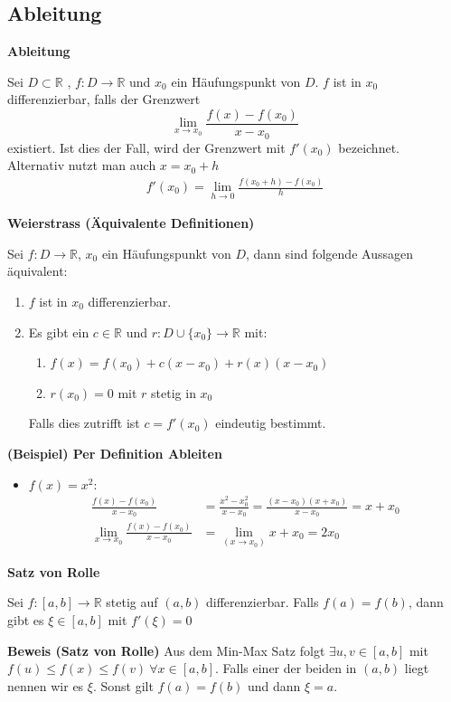 \documentclass[25pt]{sciposter}
\newcommand{\R}{\mathbb{R}}
\newenvironment{method}[1]{\begin{mdframed}[backgroundcolor=blue!10,innertopmargin=15pt, innerbottommargin=15pt, nobreak=true]
		\textbf{#1 }
	}
	{ 
	\end{mdframed}
}
\begin{document}
\begin{multicols}{3}
\section{Ableitung}

\begin{method}{Ableitung}
	Sei $D \subset \R$ , $f:D \to  \R$ und $x_0$ ein Häufungspunkt von $D$. $f$ ist in $x_0$ differenzierbar, falls der Grenzwert 
	$$ \lim\limits_{x \to x_0} \frac{f(x) -f(x_0)}{x-x_0}$$
	existiert. Ist dies der Fall, wird der Grenzwert mit $f'(x_0)$ bezeichnet.\\
	Alternativ nutzt man auch $x = x_0 + h$
	\begin{align*}
			f'(x_0) = \lim\limits_{h \to 0} \frac{f(x_0 + h) - f(x_0)}{h}
	\end{align*}
\end{method}


\begin{method}{Weierstrass (Äquivalente Definitionen)}
Sei $f : D \to \R$, $x_0$ ein Häufungspunkt von $D$, dann sind folgende Aussagen äquivalent:
\begin{enumerate}
	\item $f$ ist in $x_0$ differenzierbar.
	\item Es gibt ein $c\in \R$ und $r : D \cup \{x_0\} \to \R$ mit:
	\begin{enumerate}
		\item $f(x) = f(x_0) + c(x-x_0) + r(x) (x-x_0)$
		\item $r(x_0) = 0$ mit $r$ stetig in $x_0$
	\end{enumerate}
Falls dies zutrifft ist $c=f'(x_0)$ eindeutig bestimmt.
\end{enumerate}
\end{method}

\textbf{(Beispiel) Per Definition Ableiten}

\begin{itemize}
	\item $f(x) = x^2$:
	\begin{align*}
		\frac{f(x) - f(x_0)}{x-x_0} &= 	\frac{x^2 - x_{0}^2}{x-x_0} = \frac{(x-x_0) (x+x_0)}{x-x_0} = x + x_0\\
		\lim_{x \to x_0} \frac{f(x)-f(x_0)}{x-x_0} &= \lim_{(x\to x_0)} x + x_0 = 2x_0
	\end{align*}
\end{itemize}



\begin{method}{Satz von Rolle}
	Sei $f: [a,b] \to \R$ stetig auf $(a,b)$ differenzierbar. Falls $f(a) = f(b)$, dann gibt es $\xi \in [a,b]$ mit $f'(\xi) = 0$
\end{method}
\textbf{Beweis (Satz von Rolle)} Aus dem Min-Max Satz folgt $\exists u,v \in [a,b]$ mit $f(u) \leq f(x) \leq f(v) \ \forall x \in [a,b]$. Falls einer der beiden in $(a,b)$ liegt nennen wir es $\xi$. Sonst gilt $f(a) = f(b)$ und dann $\xi = a$.



\end{multicols}
\end{document}
